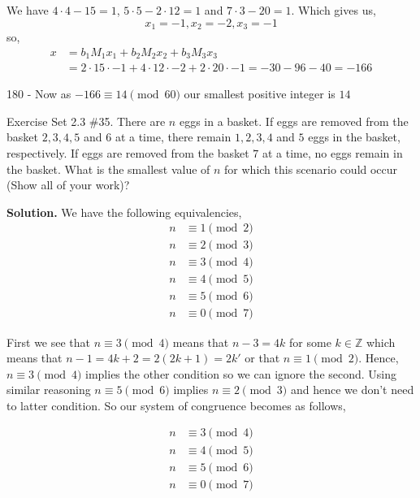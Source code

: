\documentclass[12pt]{exam}
\begin{document}
\begin{questions}
\begin{parts}
We have $4 \cdot 4 - 15 = 1$,  $5 \cdot 5 - 2 \cdot 12 = 1$ and  $7 \cdot 3 - 20 = 1$. Which gives us,  
$$ x_1 = -1, x_2 =  -2, x_3 = -1 $$ so, 
\begin{align*}
    x &= b_1M_1x_1 + b_2M_2x_2  + b_3M_3x_3\\
      &= 2 \cdot 15 \cdot -1 + 4 \cdot 12 \cdot -2 + 2 \cdot 20 \cdot -1 = -30 - 96 - 40 = -166
\end{align*}


180 - 
Now as  $-166 \equiv 14 \pmod{60}$ our smallest positive integer  is $14$





\end{parts}

\newpage 
\question  Exercise Set 2.3 \#35.
There are $n$ eggs in a basket. If eggs are removed from the basket $2,3,4,5$ and $6$ at a time,
there remain $1,2,3,4$ and $5$ eggs in the basket, respectively. If eggs are removed from the basket
$7$ at a time, no eggs remain in the basket.  What is the smallest value of $n$ for which this scenario could 
occur (Show all of your work)?

\textbf{Solution.}  We have the following equivalencies, 
\begin{align*}
    n &\equiv 1 \pmod 2\\
    n &\equiv 2 \pmod 3\\
    n &\equiv 3 \pmod 4\\
    n &\equiv 4 \pmod 5\\
    n &\equiv 5 \pmod 6\\
    n &\equiv 0 \pmod 7
\end{align*}

First we see that $n \equiv 3 \pmod 4$ means that  $n - 3 = 4k$ for some  $k \in \mathbb{Z}$ which means that  $n - 1 = 4k + 2 = 2(2k + 1) = 2k'$ or that  $n \equiv 1 \pmod 2$.  Hence,  $n \equiv 3 \pmod 4$ implies the other condition so we can ignore the second. Using similar reasoning $n \equiv 5 \pmod 6$ implies  $n \equiv 2 \pmod 3$ and hence we don't need to latter condition. So our system of congruence becomes as follows, 

\begin{align*}
    n &\equiv 3 \pmod 4\\
    n &\equiv 4 \pmod 5\\
    n &\equiv 5 \pmod 6\\
    n &\equiv 0 \pmod 7
\end{align*}



\end{questions}
\end{document}
